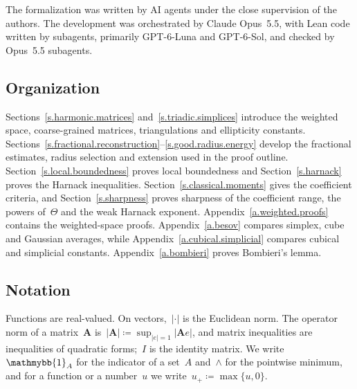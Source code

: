 \documentclass[11pt,letterpaper]{article}
\numberwithin{equation}{section}
\theoremstyle{definition}
\newcommand{\bfA}{\mathbf{A}}
\newcommand{\indc}{{\mathmybb{1}}}
\begin{document}
\smallskip

The formalization was written by AI agents under the close supervision of the authors. The development was orchestrated by Claude Opus~5.5, with Lean code written by subagents, primarily GPT-6-Luna and GPT-6-Sol, and checked by Opus~5.5 subagents.

\subsection{Organization}

Sections~\ref{s.harmonic.matrices} and~\ref{s.triadic.simplices} introduce the weighted space, coarse-grained matrices, triangulations and ellipticity constants. Sections~\ref{s.fractional.reconstruction}--\ref{s.good.radius.energy} develop the fractional estimates, radius selection and extension used in the proof outline. Section~\ref{s.local.boundedness} proves local boundedness and Section~\ref{s.harnack} proves the Harnack inequalities. Section~\ref{s.classical.moments} gives the coefficient criteria, and Section~\ref{s.sharpness} proves sharpness of the coefficient range, the powers of~$\Theta$ and the weak Harnack exponent. Appendix~\ref{a.weighted.proofs} contains the weighted-space proofs. Appendix~\ref{a.besov} compares simplex, cube and Gaussian averages, while Appendix~\ref{a.cubical.simplicial} compares cubical and simplicial constants. Appendix~\ref{a.bombieri} proves Bombieri's lemma.

\subsection{Notation}
\label{ss.notation}

Functions are real-valued. On vectors,~$|\cdot|$ is the Euclidean norm. The operator norm of a matrix~$\bfA$ is~$|\bfA|\coloneqq\sup_{|e|=1}|\bfA e|$, and matrix inequalities are inequalities of quadratic forms;~$I$ is the identity matrix. We write~$\indc_A$ for the indicator of a set~$A$ and~$\wedge$ for the pointwise minimum, and for a function or a number~$u$ we write~$u_+\coloneqq\max\{u,0\}$.

\smallskip
\end{document}
